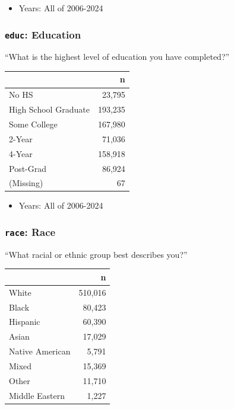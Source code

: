 \documentclass[10pt,article,oneside]{memoir}
\begin{document}
\begin{itemize}
\tightlist
\item
  Years: All of 2006-2024
\end{itemize}

\subsubsection{\texorpdfstring{\texttt{educ}:
Education}{educ: Education}}\label{educ-education}

``What is the highest level of education you have completed?''

\begin{table}[H]
\centering
\begin{tabular}[t]{lr}
\toprule
 & n\\
\midrule
No HS & 23,795\\
High School Graduate & 193,235\\
Some College & 167,980\\
2-Year & 71,036\\
4-Year & 158,918\\
Post-Grad & 86,924\\
(Missing) & 67\\
\bottomrule
\end{tabular}
\end{table}

\begin{itemize}
\tightlist
\item
  Years: All of 2006-2024
\end{itemize}

\subsubsection{\texorpdfstring{\texttt{race}:
Race}{race: Race}}\label{race-race}

``What racial or ethnic group best describes you?''

\begin{table}[H]
\centering
\begin{tabular}[t]{lr}
\toprule
 & n\\
\midrule
White & 510,016\\
Black & 80,423\\
Hispanic & 60,390\\
Asian & 17,029\\
Native American & 5,791\\
Mixed & 15,369\\
Other & 11,710\\
Middle Eastern & 1,227\\
\bottomrule
\end{tabular}
\end{table}
\end{document}
